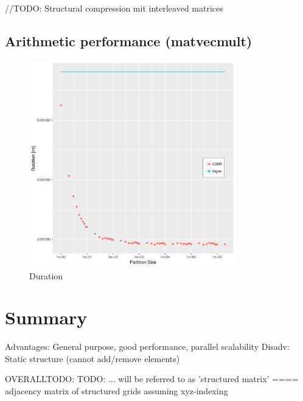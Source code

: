 \documentclass{article}
\begin{document}
    //TODO: Structural compression mit interleaved matrices

  \subsection{Arithmetic performance (matvecmult)}
    \begin{figure}[h]
      \centering
      \includegraphics[width=0.8\textwidth]{assets/bench-matvecmult-structured-duration}
      \caption{Duration}
    \end{figure}
\section{Summary}
  Advantages: General purpose, good performance, parallel scalability
  Disadv: Static structure (cannot add/remove elements)

OVERALLTODO:
  TODO: ... will be referred to as 'structured matrix' ==== adjacency matrix of structured grids assuming xyz-indexing
\printbibliography
\end{document}
